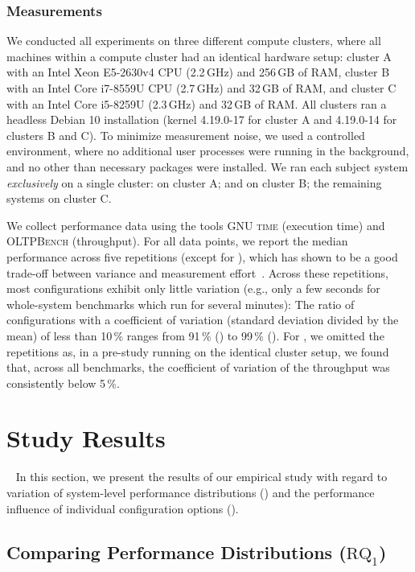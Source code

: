 {\subsubsection{Measurements}\label{sec:measurement_setup}
We conducted all experiments on three different compute clusters, where all machines within a compute cluster had an identical hardware setup: cluster A with an Intel Xeon E5-2630v4 CPU (2.2\,GHz) and 256\,GB of RAM, cluster B  with an Intel Core i7-8559U CPU (2.7\,GHz) and 32\,GB of RAM, and cluster C with an Intel Core i5-8259U (2.3\,GHz) and 32\,GB of RAM. All clusters ran a headless Debian 10 installation (kernel 4.19.0-17 for cluster A and 4.19.0-14 for clusters B and C). To minimize measurement noise, we used a controlled environment, where no additional user processes were running in the background, and no other than necessary packages were installed. 
We ran each subject system \textit{exclusively} on a single cluster: \htwo on cluster A; \dconvert and \batik on cluster B; the remaining systems on cluster C.

{We collect performance data using the tools \textsc{GNU time} (execution time) and \textsc{OLTPBench} (throughput).} For all data points, we report the median performance across five repetitions (except for \htwo), which has shown to be a good trade-off between variance and measurement effort~\cite{molyneauxArtApplicationPerformance2015}. 
{Across these repetitions, most configurations exhibit only little variation (e.g., only a few seconds for whole-system benchmarks which run for several minutes): The ratio of configurations with a coefficient of variation (standard deviation divided by the mean) of less than 10\,\% ranges from 91\,\% (\lrzip) to 99\,\% (\xzwo).}
For \htwo, we omitted the repetitions as, in a pre-study running on the identical cluster setup, we found that, across all benchmarks, the coefficient of variation of the throughput was consistently below 5\,\%.

\section{Study Results}~\label{sec:results}
In this section, we present the results of our empirical study with regard to variation of system-level performance distributions () and the performance influence of individual configuration options ().

\subsection{Comparing Performance Distributions ($\text{RQ}_\text{1}$)}\label{sec:rq1}
}
